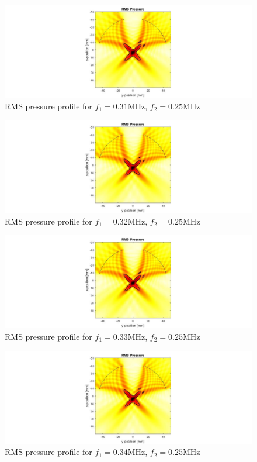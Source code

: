 \documentclass[10pt,a4paper]{article}
\begin{document}
\begin{figure}[!h]\label{f310kHz}
\hspace*{-5cm}                                                    
\includegraphics[scale=0.6]{f310kHz}
\caption{RMS pressure profile for $f_1 = 0.31$MHz, $f_2 = 0.25$MHz}
\end{figure}
\begin{figure}[!h]\label{f320kHz}
\hspace*{-5cm}                                                    
\includegraphics[scale=0.6]{f320kHz}
\caption{RMS pressure profile for $f_1 = 0.32$MHz, $f_2 = 0.25$MHz}
\end{figure}
\begin{figure}[!h]\label{f330kHz}
\hspace*{-5cm}                                                    
\includegraphics[scale=0.6]{f330kHz}
\caption{RMS pressure profile for $f_1 = 0.33$MHz, $f_2 = 0.25$MHz}
\end{figure}
\begin{figure}[!h]\label{f340kHz}
\hspace*{-5cm}                                                    
\includegraphics[scale=0.6]{f340kHz}
\caption{RMS pressure profile for $f_1 = 0.34$MHz, $f_2 = 0.25$MHz}
\end{figure}
\end{document}
